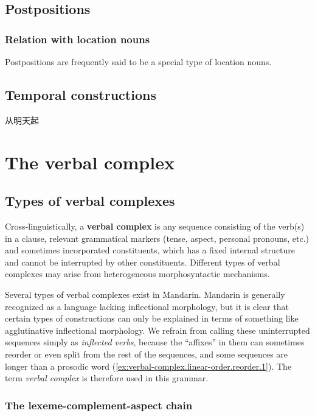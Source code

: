 \documentclass[UTF8, a4paper, oneside, scheme=plain, 12pt]{ctexrep}
\newcommand*{\concept}[1]{\textbf{#1}}
\newcommand*{\term}[1]{\emph{#1}}
\begin{document}
\section{Postpositions}

\subsection{Relation with location nouns}

Postpositions are frequently said to be a special type of location nouns.

\section{Temporal constructions}\label{sec:adpositions.temporal}

从明天起

\chapter{The verbal complex}\label{chap:verbal-complex}

\section{Types of verbal complexes}\label{sec:verbal-complex.linear-order}

Cross-linguistically, a \concept{verbal complex} is
any sequence consisting of the verb(s) in a clause,
relevant grammatical markers (tense, aspect, personal pronouns, etc.)
and sometimes incorporated constituents,
which has a fixed internal structure and cannot be interrupted by other constituents.
Different types of verbal complexes may arise from
heterogeneous morphosyntactic mechanisms.

Several types of verbal complexes exist in Mandarin.
Mandarin is generally recognized as a language lacking inflectional morphology,
but it is clear that certain types of constructions
can only be explained in terms of something like agglutinative inflectional morphology.
We refrain from calling these uninterrupted sequences simply as \term{inflected verbs},
because the ``affixes'' in them can sometimes reorder or even split from the rest of the sequences,
and some sequences are longer than a prosodic word
(\ref{ex:verbal-complex.linear-order.reorder.1}).
The term \term{verbal complex} is therefore used in this grammar.

\subsection{The lexeme-complement-aspect chain}\label{sec:verbal-complex.v-c-a}
\end{document}
